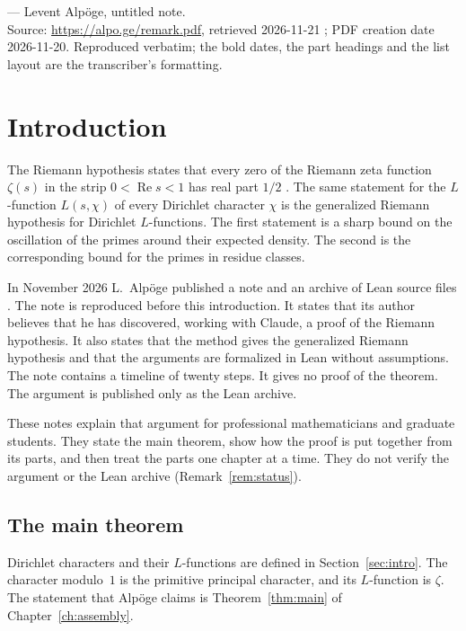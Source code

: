 \documentclass[11pt]{amsbook}
\theoremstyle{plain}
\theoremstyle{definition}
\theoremstyle{remark}
\numberwithin{equation}{section}
\numberwithin{figure}{chapter}
\numberwithin{table}{chapter}
\begin{document}
\begin{flushright}
--- Levent Alp\"oge, untitled note.\\
{\small Source: \url{https://alpo.ge/remark.pdf}, retrieved 2026-11-21
\cite{AlpogeRemark2026}; PDF creation date 2026-11-20. Reproduced
verbatim; the bold dates, the part headings and the list layout are the
transcriber's formatting.}
\end{flushright}
\endgroup
\clearpage

\mainmatter
\clearpage
\theoremstyle{plain}
\newtheorem*{maintheorem}{Main Theorem}
\chapter*{Introduction}
\label{ch:introduction}

The Riemann hypothesis states that every zero of the Riemann zeta
function $\zeta(s)$ in the strip $0<\operatorname{Re}s<1$ has real
part $1/2$ \cite{Riemann1859}. The same statement for the
$L$-function $L(s,\chi)$ of every Dirichlet character $\chi$ is the
generalized Riemann hypothesis for Dirichlet $L$-functions. The
first statement is a sharp bound on the oscillation of the primes
around their expected density. The second is the corresponding
bound for the primes in residue classes.

In November 2026 L.~Alp\"oge published a note
\cite{AlpogeRemark2026} and an archive of Lean source files
\cite{AlpogeArchive2026}. The note is reproduced before this
introduction. It states that its author believes that he has
discovered, working with Claude, a proof of the Riemann hypothesis.
It also states that the method
gives the generalized Riemann hypothesis and that the arguments are
formalized in Lean without assumptions. The note contains a
timeline of twenty steps. It gives no proof of the theorem. The
argument is published only as the Lean archive.

These notes explain that argument for professional mathematicians
and graduate students. They state the main theorem, show how the
proof is put together from its parts, and then treat the parts one
chapter at a time. They do not verify the argument or the Lean
archive (Remark~\ref{rem:status}).

\section*{The main theorem}

Dirichlet characters and their $L$-functions are defined in
Section~\ref{sec:intro}. The character modulo~$1$ is the primitive
principal character, and its $L$-function is $\zeta$. The statement
that Alp\"oge claims is Theorem~\ref{thm:main} of
Chapter~\ref{ch:assembly}.
\end{document}
